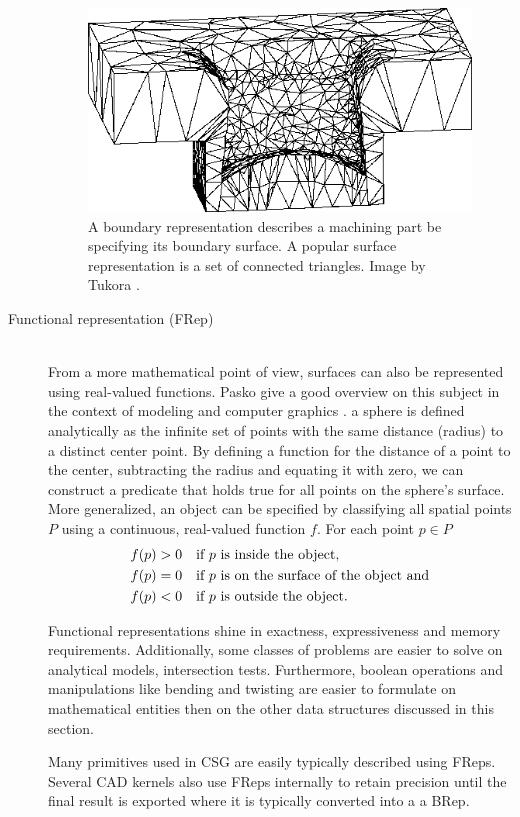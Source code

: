 \begin{description}
	\begin{figure}[h]
		\centering
		\includegraphics[width=\textwidth]{images/brep}
		\caption{
			A boundary representation describes a machining part be specifying its boundary surface. A popular surface representation is a set of connected triangles. 
			Image by Tukora \cite{virtual_machining_review}. 
		}
		\label{fig:brep}
	\end{figure}
	
	\item[Functional representation (FRep)] \hfill \\
	From a more mathematical point of view, surfaces can also be represented using real-valued functions.
	Pasko \etal give a good overview on this subject in the context of modeling and computer graphics \cite{frep}.
	\Eg a sphere is defined analytically as the infinite set of points with the same distance (radius) to a distinct center point.
	By defining a function for the distance of a point to the center, subtracting the radius and equating it with zero, we can construct a predicate that holds true for all points on the sphere's surface.
	More generalized, an object can be specified by classifying all spatial points $P$ using a continuous, real-valued function $f$. For each point $p \in P$
	\begin{align}
		f(p) &> 0 \quad \text{if $p$ is inside the object,}               \notag \\
		f(p) &= 0 \quad \text{if $p$ is on the surface of the object and} \notag \\
		f(p) &< 0 \quad \text{if $p$ is outside the object.}              \notag
	\end{align}
	
	Functional representations shine in exactness, expressiveness and memory requirements.
	Additionally, some classes of problems are easier to solve on analytical models, \eg intersection tests.
	Furthermore, boolean operations and manipulations like bending and twisting are easier to formulate on mathematical entities then on the other data structures discussed in this section.
	
	Many primitives used in CSG are easily typically described using FReps.
	Several CAD kernels also use FReps internally to retain precision until the final result is exported where it is typically converted into a \eg a BRep.
	
\end{description}


